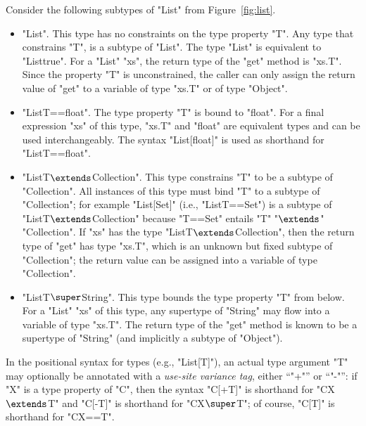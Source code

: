 Consider the following subtypes  of \xcd"List" from
Figure~\ref{fig:list}.
\begin{itemize}
\item \xcd"List".  This type has no constraints on the type
property \xcd"T".
Any type that constrains \xcd"T",
is a subtype of \xcd"List".  The type \xcd"List" is equivalent to
\xcd"List{true}".
%
For a \xcd"List" \xcd"xs", the return type of the \xcd"get" method
is \xcd"xs.T".
Since the property \xcd"T" is unconstrained,
the caller can only assign the return value of \xcd"get"
to a variable of type \xcd"xs.T" or of type \xcd"Object".

\item \xcd"List{T==float}".
The type property \xcd"T" is bound to \xcd"float".
For a final expression \xcd"xs" of this type,
\xcd"xs.T" and \xcd"float" are equivalent types and can be used
interchangeably.
The syntax \xcd"List[float]" is used as
shorthand for \xcd"List{T==float}".

\item \xcdmath"List{T$\extends$Collection}".
This type constrains \xcd"T" to be a subtype of \xcd"Collection".
All instances of this type must bind \xcd"T" to a subtype of
\xcd"Collection"; for example \xcd"List[Set]" (i.e.,
\xcd"List{T==Set}") is a subtype of
\xcdmath"List{T$\extends$Collection}" because \xcd"T==Set" entails
\xcdmath"T"
\xcdmath"$\extends$"
\xcdmath"Collection".
%
If \xcd"xs" has the type \xcdmath"List{T$\extends$Collection}",
then the return type of \xcd"get" has type \xcd"xs.T", which is an unknown but
fixed subtype of \xcd"Collection"; the return value can be
assigned into a variable of type \xcd"Collection".

\item \xcdmath"List{T$\super$String}".  This type bounds the type property
\xcd"T"
from below.  For a \xcd"List" \xcd"xs" of this type, any
supertype of \xcd"String" may flow into a variable of type \xcd"xs.T".
The return type of the \xcd"get"
method is known to be a
supertype of \xcd"String" (and implicitly a subtype of \xcd"Object").
\end{itemize}

In the positional syntax for types (e.g., \xcd"List[T]"),
an actual type argument \xcd"T" may optionally
be annotated
with
a \emph{use-site variance tag}, either ``\xcd"+"'' or ``\xcd"-"'':
if \xcd"X" is a type property of \xcd"C", then
the syntax \xcd"C[+T]" is shorthand for \xcdmath"C{X$\extends$T}" and
\xcd"C[-T]" is shorthand for \xcdmath"C{X$\super$T}"; of course,
\xcd"C[T]" is shorthand for \xcd"C{X==T}".




